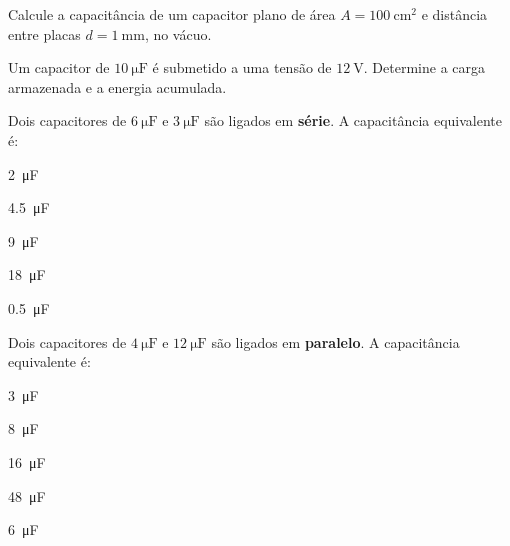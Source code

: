 \begin{questao}[1]{}
Calcule a capacitância de um capacitor plano de área $A = \SI{100}{\centi\meter\squared}$
e distância entre placas $d = \SI{1}{\milli\meter}$, no vácuo.
\end{questao}

\begin{questao}[1]{}
Um capacitor de $\SI{10}{\micro\farad}$ é submetido a uma tensão de
$\SI{12}{\volt}$. Determine a carga armazenada e a energia acumulada.
\end{questao}

\begin{questao}[1]{}
Dois capacitores de $\SI{6}{\micro\farad}$ e $\SI{3}{\micro\farad}$ são ligados
em \textbf{série}. A capacitância equivalente é:
\begin{alternativas}[3]
\item \SI{2}{\micro\farad}
\item \SI{4.5}{\micro\farad}
\item \SI{9}{\micro\farad}
\item \SI{18}{\micro\farad}
\item \SI{0.5}{\micro\farad}
\end{alternativas}
\end{questao}

\begin{questao}[1]{}
Dois capacitores de $\SI{4}{\micro\farad}$ e $\SI{12}{\micro\farad}$ são ligados
em \textbf{paralelo}. A capacitância equivalente é:
\begin{alternativas}[3]
\item \SI{3}{\micro\farad}
\item \SI{8}{\micro\farad}
\item \SI{16}{\micro\farad}
\item \SI{48}{\micro\farad}
\item \SI{6}{\micro\farad}
\end{alternativas}
\end{questao}

